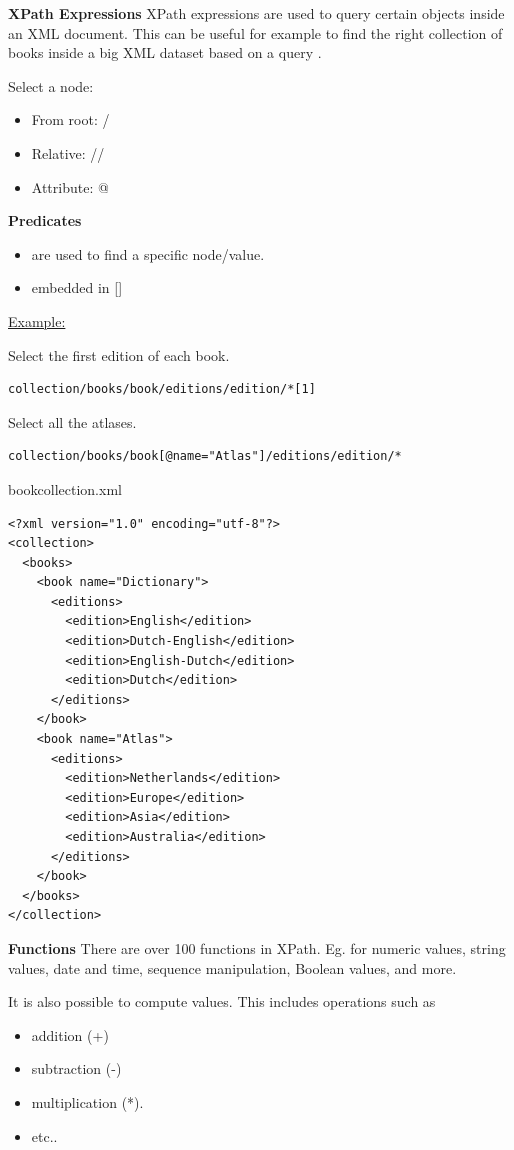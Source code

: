 \documentclass[11pt]{article}
\begin{document}
\textbf{XPath Expressions}
XPath expressions are used to query certain objects inside an XML document. This can be useful for example to find the right collection of books inside a big XML dataset based on a query \cite{xpathwiki}.

Select a node:

\begin{itemize}
  \item From root: /
  \item Relative: //
  \item Attribute: @
\end{itemize}

\textbf{Predicates}
\begin{itemize}
  \item are used to find a specific node/value.
  \item embedded in []
\end{itemize}

\underline{Example:} 

Select the first edition of each book.

\begin{lstlisting}
collection/books/book/editions/edition/*[1]
\end{lstlisting}

Select all the atlases.

\begin{lstlisting}
collection/books/book[@name="Atlas"]/editions/edition/*
\end{lstlisting}

bookcollection.xml

\begin{lstlisting}
<?xml version="1.0" encoding="utf-8"?>
<collection>
  <books>
    <book name="Dictionary">
      <editions>
        <edition>English</edition>
        <edition>Dutch-English</edition>
        <edition>English-Dutch</edition>
        <edition>Dutch</edition>
      </editions>
    </book>
    <book name="Atlas">
      <editions>
        <edition>Netherlands</edition>
        <edition>Europe</edition>
        <edition>Asia</edition>
        <edition>Australia</edition>
      </editions>
    </book>
  </books>
</collection>
\end{lstlisting}

\textbf{Functions}
There are over 100 functions in XPath. Eg. for numeric values, string values, date and time, sequence manipulation, Boolean values, and more.

It is also possible to compute values. This includes operations such as
\begin{itemize}
  \item addition (+)
  \item subtraction (-)
  \item multiplication (*).
  \item etc..
\end{itemize}
\end{document}
